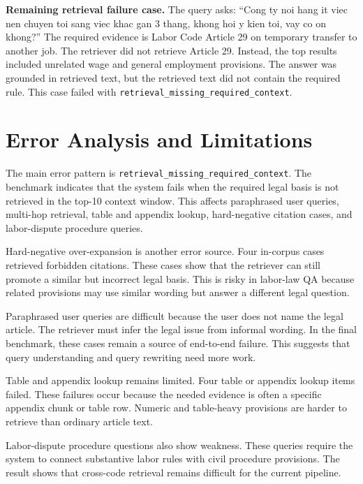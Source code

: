\textbf{Remaining retrieval failure case.} The query asks: ``Cong ty noi hang it viec nen chuyen toi sang viec khac gan 3 thang, khong hoi y kien toi, vay co on khong?'' The required evidence is Labor Code Article 29 on temporary transfer to another job. The retriever did not retrieve Article 29. Instead, the top results included unrelated wage and general employment provisions. The answer was grounded in retrieved text, but the retrieved text did not contain the required rule. This case failed with \texttt{retrieval\_\allowbreak{}missing\_\allowbreak{}required\_\allowbreak{}context}.

\section{Error Analysis and Limitations}
\label{sec:error-analysis-and-limitations}

The main error pattern is \texttt{retrieval\_missing\_required\_context}. The benchmark indicates that the system fails when the required legal basis is not retrieved in the top-10 context window. This affects paraphrased user queries, multi-hop retrieval, table and appendix lookup, hard-negative citation cases, and labor-dispute procedure queries.

Hard-negative over-expansion is another error source. Four in-corpus cases retrieved forbidden citations. These cases show that the retriever can still promote a similar but incorrect legal basis. This is risky in labor-law QA because related provisions may use similar wording but answer a different legal question.

Paraphrased user queries are difficult because the user does not name the legal article. The retriever must infer the legal issue from informal wording. In the final benchmark, these cases remain a source of end-to-end failure. This suggests that query understanding and query rewriting need more work.

Table and appendix lookup remains limited. Four table or appendix lookup items failed. These failures occur because the needed evidence is often a specific appendix chunk or table row. Numeric and table-heavy provisions are harder to retrieve than ordinary article text.

Labor-dispute procedure questions also show weakness. These queries require the system to connect substantive labor rules with civil procedure provisions. The result shows that cross-code retrieval remains difficult for the current pipeline.

